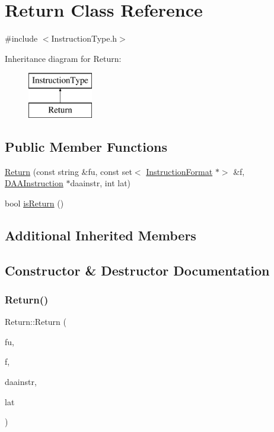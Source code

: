 \hypertarget{classReturn}{}\section{Return Class Reference}
\label{classReturn}


{\ttfamily \#include $<$Instruction\+Type.\+h$>$}

Inheritance diagram for Return\+:\begin{figure}[H]
\begin{center}
\leavevmode
\includegraphics[height=2.000000cm]{classReturn}
\end{center}
\end{figure}
\subsection*{Public Member Functions}
\begin{DoxyCompactItemize}
\item 
\hyperlink{classReturn_a6c2b38e370795f8ab4411ca80f55a6f2}{Return} (const string \&fu, const set$<$ \hyperlink{classInstructionFormat}{Instruction\+Format} $\ast$$>$ \&f, \hyperlink{classDAAInstruction}{D\+A\+A\+Instruction} $\ast$daainstr, int lat)
\item 
bool \hyperlink{classReturn_ad3412361560f4acdb1e4f73ab65d3bc7}{is\+Return} ()
\end{DoxyCompactItemize}
\subsection*{Additional Inherited Members}


\subsection{Constructor \& Destructor Documentation}
\mbox{\label{classReturn_a6c2b38e370795f8ab4411ca80f55a6f2}} 
\subsubsection{\texorpdfstring{Return()}{Return()}}
{\footnotesize\ttfamily Return\+::\+Return (\begin{DoxyParamCaption}\item[{const string \&}]{fu,  }\item[{const set$<$ \hyperlink{classInstructionFormat}{Instruction\+Format} $\ast$$>$ \&}]{f,  }\item[{\hyperlink{classDAAInstruction}{D\+A\+A\+Instruction} $\ast$}]{daainstr,  }\item[{int}]{lat }\end{DoxyParamCaption})}




